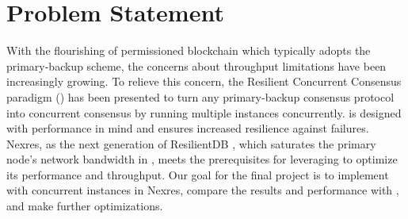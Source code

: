 \section{Problem Statement}
\par With the flourishing of permissioned blockchain which typically adopts the primary-backup scheme, 
the concerns about throughput limitations have been increasingly growing. To relieve this concern, the Resilient 
Concurrent Consensus paradigm (\RCC{}) \cite{rcc} has been presented to turn any primary-backup consensus protocol into concurrent 
consensus by running multiple instances concurrently. \RCC{} is designed with performance in mind and ensures increased 
resilience against failures. Nexres, as the next generation of ResilientDB \cite{gupta2020resilientdb, rahnama2020scalable}, which saturates 
the primary node's network bandwidth in \PBFT{} \cite{pbft}, meets the prerequisites for leveraging \RCC{} to optimize its performance 
and throughput. Our goal for the final project is to implement \RCC{} with concurrent \PBFT{} instances in Nexres, compare 
the results and performance with \PBFT{}, and make further optimizations.